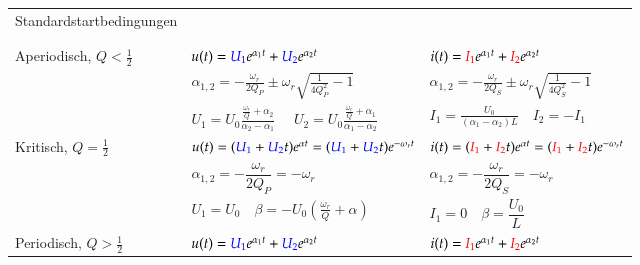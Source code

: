 \begin{tabular}{| p{4cm} | p{7cm} | p{7cm} |}
	Standardstartbedingungen &
	\begin{minipage}{7cm}
    	\vspace{0.1cm}
    	$u(t=0)=U_0$\quad
    	$\dot{u}(t=0)=-\dfrac{U_o}{RC}$ \\
    \end{minipage} &
	\begin{minipage}{7cm}
     	\vspace{0.1cm}
    	$i(t=0)=0$\quad
    	$\dot{i}(t=0)=\dfrac{U_o}{L}$\\   
    \end{minipage}\\
	\hline
	Aperiodisch, $ Q < \frac{1}{2}$
		& $u(t) = \textcolor{blue}{U_1} e^{\alpha_1 t} + \textcolor{blue}{U_2} e^{\alpha_2 t}$ 
		& $i(t) = \textcolor{red}{I_1} e^{\alpha_1 t} + \textcolor{red}{I_2} e^{\alpha_2 t}$ \\
		& $\alpha_{1,2} = - \frac{\omega_r}{2 Q_P} \pm \omega_r \sqrt{\frac{1}{4 Q_P^2} - 1}$	
		& $\alpha_{1,2} = - \frac{\omega_r}{2 Q_S} \pm \omega_r \sqrt{\frac{1}{4Q_S^2} - 1}$\\
		& $U_1 = U_0 \frac{\frac{\omega_r}{Q} +
		\alpha_2}{\alpha_2 - \alpha_1} \quad$ $U_2 = U_0 \frac{\frac{\omega_r}{Q} +
		\alpha_1}{\alpha_1 - \alpha_2}$
		& $I_1 = \frac{U_0}{(\alpha_1 - \alpha_2)L} \quad I_2
		= -I_1$
		\vspace{0.1cm}
		\\
	\hline 	
	Kritisch, $ Q = \frac{1}{2}$
		& $u(t) = (\textcolor{blue}{U_1} + \textcolor{blue}{U_2} t) 
		e^{\alpha t} = (\textcolor{blue}{U_1} + \textcolor{blue}{U_2} t) 
		e^{- \omega_r t}$ 
		& $i(t) = (\textcolor{red}{I_1} + \textcolor{red}{I_2} t) 
		e^{\alpha t} = (\textcolor{red}{I_1} + \textcolor{red}{I_2} t) 
		e^{- \omega_r t}$ \\
		& $\alpha_{1,2} = - \dfrac{\omega_r}{2 Q_P} = - \omega_r$ & 
		$\alpha_{1,2} = - \dfrac{\omega_r}{2 Q_S} = - \omega_r$\\
		& $U_1 = U_0 \quad \beta = -U_0 \left(
		\frac{\omega_r}{Q}+\alpha \right)$ & 
		$I_1 = 0 \quad \beta = \dfrac{U_0}{L}$
		\vspace{0.1cm}
		\\
	\hline 	
	Periodisch, $ Q > \frac{1}{2}$
		& $u(t) = \textcolor{blue}{U_1} e^{\alpha_1 t} + 
					\textcolor{blue}{U_2} e^{\alpha_2 t} $
		& $i(t) = \textcolor{red}{I_1} e^{\alpha_1 t} + 
					\textcolor{red}{I_2} e^{\alpha_2 t} $ \\

\end{tabular}
